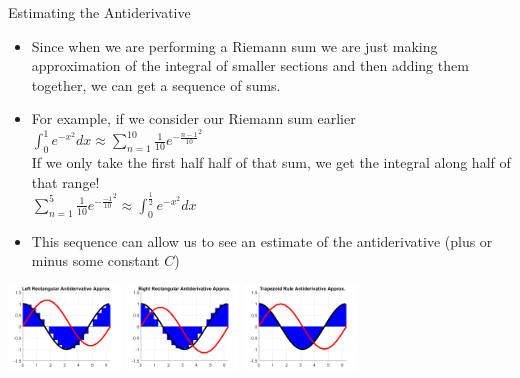 {}\documentclass[letterpaper,
compress,
xcolor=x11names,
]{beamer}
\begin{document}
\begin{frame}{Estimating the Antiderivative}
	\footnotesize
	\begin{itemize}
		\item Since when we are performing a Riemann sum we are just making approximation of the integral of smaller sections and then adding them together, we can get a sequence of sums.
		\item For example, if we consider our Riemann sum earlier $\int_{0}^{1}e^{-x^2}dx \approx \sum_{n=1}^{10}\frac{1}{10}e^{-\frac{n-1}{10}^2}$ \\
		If we only take the first half half of that sum, we get the integral along half of that range! \\
		$ \sum_{n=1}^{5}\frac{1}{10}e^{-\frac{-1}{10}^2} \approx \int_{0}^{\frac{1}{2}}e^{-x^2}dx$
		\item This sequence can allow us to see an estimate of the antiderivative (plus or minus some constant $C$)
	\end{itemize}
	\begin{center}
		\includegraphics[height = 2.25cm]{left_antideriv_approx.png} \hspace{0.5cm}
		\includegraphics[height = 2.25cm]{right_antideriv_approx.png} \hspace{0.5cm}
		\includegraphics[height = 2.25cm]{trapz_antideriv_approx.png}
	\end{center}
\end{frame}

\end{document}
